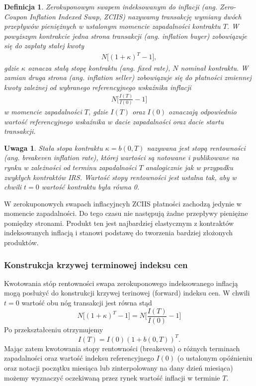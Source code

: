 \documentclass{mini}
\theoremstyle{mythstyle}
\newtheorem{Definicja}{Definicja}[chapter]
\newtheorem{Uwaga}{Uwaga}[chapter]
\begin{document}
	\begin{Definicja}
		Zerokuponowym swapem indeksowanym do inflacji (ang. Zero-Coupon Inflation Indexed Swap, ZCIIS) nazywamy transakcję wymiany dwóch przepływów pieniężnych w ustalonym momencie zapadalności kontraktu $T$. W powyższym kontrakcie jedna strona transakcji (ang. inflation buyer) zobowiązuje się do zapłaty stałej kwoty
		\begin{eqnarray*}
			N\bigg[(1+\kappa)^T -1\bigg],
		\end{eqnarray*}
		gdzie $\kappa$ oznacza stałą stopę kontraktu (ang. fixed rate), $N$ nominał kontraktu. W zamian druga strona (ang. inflation seller) zobowiązuje się do płatności zmiennej kwoty zależnej od wybranego referencyjnego wskaźnika inflacji
		\begin{eqnarray*}
			N\bigg[\frac{I(T)}{I(0)} - 1\bigg]
		\end{eqnarray*}
		w momencie zapadalności $T$, gdzie $I(T)$ oraz $I(0)$ oznaczają odpowiednio wartość referencyjnego wskaźnika w dacie zapadalności oraz dacie startu transakcji.\\
\end{Definicja}		

\begin{Uwaga}
	Stała stopa kontraktu $\kappa = b(0,T)$ nazywana jest stopą rentowności (ang. breakeven inflation rate), której wartości są notowane i publikowane na rynku w zależności od terminu zapadalności $T$ analogicznie jak w przypadku zwykłych kontraktów IRS. Wartość stopy rentowności jest ustalna tak, aby w chwili $t = 0$ wartość kontraktu była równa 0.
\end{Uwaga}
	
	W zerokuponowych swapach inflacyjncyh ZCIIS płatności zachodzą jedynie w momencie zapadalności. Do tego czasu nie następują żadne przepływy pieniężne pomiędzy stronami. Produkt ten jest najbardziej elastycznym z kontraktów indeksowanych inflacją i stanowi podstawę do tworzenia bardziej złożonych produktów.
	
	\subsubsection*{Konstrukcja krzywej terminowej indeksu cen}
	
	Kwotowania stóp rentowności swapa zerokuponowego indeksowanego inflacją mogą posłużyć do konstrukcji krzywej terinowej (forward) indeksu cen. W chwili $t = 0$ wartość obu nóg transakcji jest równa stąd
	\begin{equation}
	N\bigg[(1+\kappa)^T -1\bigg] = N\bigg[\frac{I(T)}{I(0)} - 1\bigg]
	\end{equation}
	Po przekształceniu otrzymujemy
	\begin{equation}
		I(T) = I(0) (1 + b(0,T))^T.
	\end{equation}
	Mając zatem kwotowania stopy rentowności (breakeven) o różnych terminach zapadalności oraz wartość indeksu referencyjnego $I(0)$ (o ustalonym opóźnieniu oraz  notacji początku miesiąca lub zinterpolowany na dany dzień miesiąca) możemy wyznaczyć oczekiwaną przez rynek wartość inflacji w terminie $T$.
	
\end{document}
